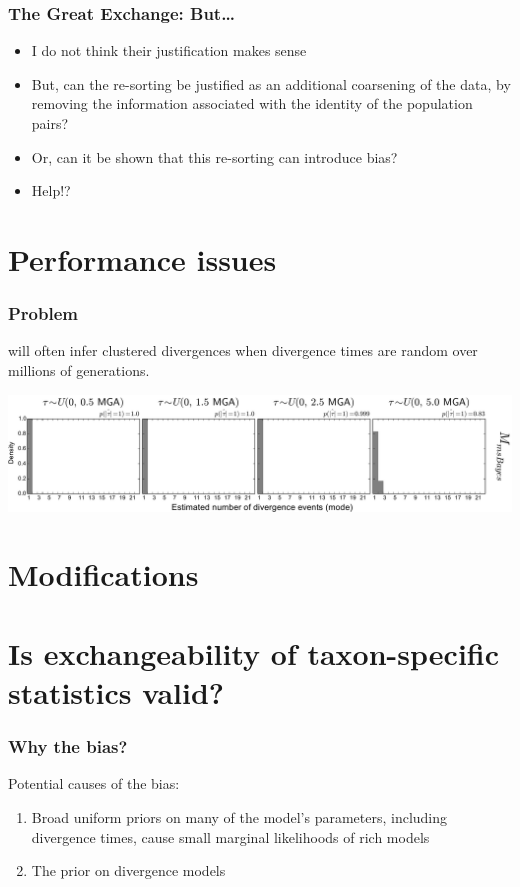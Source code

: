 \begin{frame}
    \frametitle{The Great Exchange: But\ldots}
    \begin{itemize}
        \item I do not think their justification makes sense
        \item But, can the re-sorting be justified as an additional coarsening
            of the data, by removing the information associated with the
            identity of the population pairs?
        \item Or, can it be shown that this re-sorting can introduce bias?
        \item Help!?
    \end{itemize}
\end{frame}

\section{Performance issues}

\begin{frame}
    \frametitle{Problem}
    \msb will often infer clustered divergences when divergence times
    are random over millions of generations.

    \vspace{1cm}
        \centerline{
        \includegraphics[width=1.13\textwidth]{../images/old_old_power_psi_mode.pdf}}
\end{frame}


\section{Modifications}
\section{Is exchangeability of taxon-specific statistics valid?}


\begin{frame}
    \frametitle{Why the bias?}
    Potential causes of the bias:
    \begin{enumerate}
        \item Broad uniform priors on many of the model's parameters, including
            divergence times, cause small marginal likelihoods of rich models
        \item The prior on divergence models
    \end{enumerate}
\end{frame}

